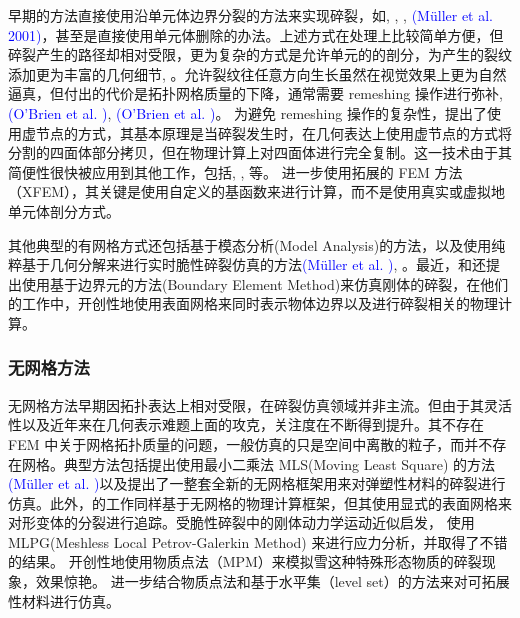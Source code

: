 早期的方法直接使用沿单元体边界分裂的方法来实现碎裂，如, , , \textcolor{blue}{(M\"{u}ller et al. 2001)\parencite{Muller2001}}，甚至是直接使用单元体删除的办法。上述方式在处理上比较简单方便，但碎裂产生的路径却相对受限，更为复杂的方式是允许单元的的剖分，为产生的裂纹添加更为丰富的几何细节, 。允许裂纹往任意方向生长虽然在视觉效果上更为自然逼真，但付出的代价是拓扑网格质量的下降，通常需要 remeshing 操作进行弥补, \textcolor{blue}{(O'Brien et al. )\parencite{OBrien1999}}, \textcolor{blue}{(O'Brien et al. )\parencite{OBrien2002}}。 为避免 remeshing 操作的复杂性，提出了使用虚节点的方式，其基本原理是当碎裂发生时，在几何表达上使用虚节点的方式将分割的四面体部分拷贝，但在物理计算上对四面体进行完全复制。这一技术由于其简便性很快被应用到其他工作，包括, , 等。 进一步使用拓展的 FEM 方法（XFEM），其关键是使用自定义的基函数来进行计算，而不是使用真实或虚拟地单元体剖分方式。

其他典型的有网格方式还包括基于模态分析(Model Analysis)的方法，以及使用纯粹基于几何分解来进行实时脆性碎裂仿真的方法\textcolor{blue}{(M\"{u}ller et al. )\parencite{Muller2013}}, 。最近，和还提出使用基于边界元的方法(Boundary Element Method)来仿真刚体的碎裂，在他们的工作中，开创性地使用表面网格来同时表示物体边界以及进行碎裂相关的物理计算。

\subsubsection{无网格方法}

无网格方法早期因拓扑表达上相对受限，在碎裂仿真领域并非主流。但由于其灵活性以及近年来在几何表示难题上面的攻克，关注度在不断得到提升。其不存在FEM 中关于网格拓扑质量的问题，一般仿真的只是空间中离散的粒子，而并不存在网格。典型方法包括提出使用最小二乘法 MLS(Moving Least Square) 的方法\textcolor{blue}{(M\"{u}ller et al. )\parencite{Muller2004}}以及提出了一整套全新的无网格框架用来对弹塑性材料的碎裂进行仿真。此外，的工作同样基于无网格的物理计算框架，但其使用显式的表面网格来对形变体的分裂进行追踪。受脆性碎裂中的刚体动力学运动近似启发，
使用 MLPG(Meshless Local Petrov-Galerkin Method) 来进行应力分析，并取得了不错的结果。
开创性地使用物质点法（MPM）来模拟雪这种特殊形态物质的碎裂现象，效果惊艳。
进一步结合物质点法和基于水平集（level set）的方法来对可拓展性材料进行仿真。

